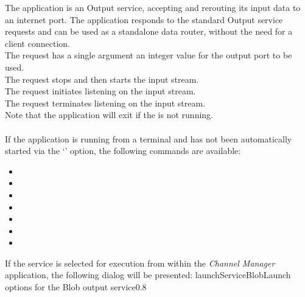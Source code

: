 The  application is an Output service, accepting and
rerouting its input data to an internet port.
The application responds to the standard Output service requests and can be used as a
standalone data router, without the need for a client connection.\\

The  request has a single argument
\longDash{} an integer value for the output port to be used.\\

The  request stops and then
starts the input stream.\\

The  request initiates listening
on the input stream.\\

The  request terminates listening
on the input stream.\\

Note that the application will exit if the
 is not running.\\

\insertAppParameters
{}
\insertOutputServiceComment\\

If the application is running from a terminal and has not been automatically started via
the `' option, the following commands are available:
\begin{itemize}
\item{}
\item\exSp{}
\item\exSp{}
\item\exSp{}
\item\exSp{}
\item\exSp{}
\item\exSp{}
\end{itemize}
\condPage
If the service is selected for execution from within the \emph{Channel Manager}
application, the following dialog will be presented:
%
{launchServiceBlob}{Launch options for the Blob output service}{0.8}

